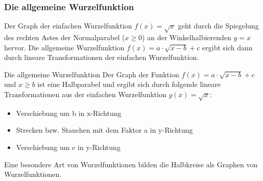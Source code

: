  \subsubsection{Die allgemeine Wurzelfunktion}
 Der Graph der einfachen Wurzelfunktion $f(x) = \sqrt{x}$ geht durch die Spiegelung des rechten Astes der Normalparabel ($x\geq 0$) an der Winkelhalbierenden $y=x$ hervor. Die allgemeine Wurzelfunktion $f(x) = a\cdot \sqrt{x-b} +c$ ergibt sich dann durch lineare Transformationen der einfachen Wurzelfunktion.
 \begin{satz}{Die allgemeine Wurzelfunktion}{}
Der Graph der Funktion $f(x) = a\cdot \sqrt{x-b}+c$ und $x\geq b$ ist eine Halbparabel und ergibt sich durch folgende lineare Transformationen aus der einfachen Wurzelfunktion $g(x)= \sqrt{x}$:
\begin{itemize}
    \item Verschiebung um b in x-Richtung
    \item Strecken bzw. Stauchen mit dem Faktor a in y-Richtung
    \item Verschiebung um c in y-Richtung
\end{itemize}

 \begin{center}
\end{center}
 \end{satz}
 Eine besondere Art von Wurzelfunktionen bilden die Halbkreise als Graphen von Wurzelfunktionen.
